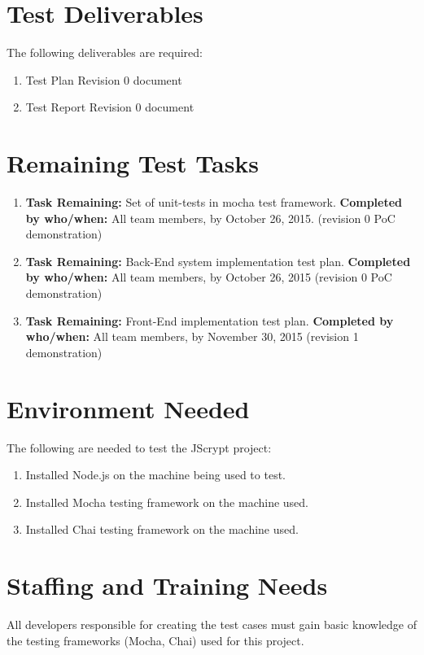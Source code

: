 \documentclass[12pt]{article}
\begin{document}
\section{Test Deliverables}
The following deliverables are required:
\begin{enumerate}
  \item Test Plan Revision 0 document
  \item Test Report Revision 0 document
\end{enumerate}

\section{Remaining Test Tasks}
\begin{enumerate}
  \item \textbf{Task Remaining:} Set of unit-tests in mocha test framework. \newline
  \textbf{Completed by who/when:} All team members, by October 26, 2015. (revision 0 PoC demonstration) 
  \item \textbf{Task Remaining:} Back-End system implementation test plan. \newline
  \textbf{Completed by who/when:} All team members, by October 26, 2015 (revision 0 PoC demonstration)
  \item \textbf{Task Remaining:} Front-End implementation test plan. \newline
  \textbf{Completed by who/when:} All team members, by November 30, 2015 (revision 1 demonstration)
\end{enumerate}
\section{Environment Needed}
The following are needed to test the JScrypt project:
  \begin{enumerate}
    \item Installed Node.js on the machine being used to test.
    \item Installed Mocha testing framework on the machine used.
    \item Installed Chai testing framework on the machine used.
  \end{enumerate}

\section{Staffing and Training Needs}
All developers responsible for creating the test cases must gain basic knowledge of the testing frameworks (Mocha, Chai) used for this project.
\end{document}
